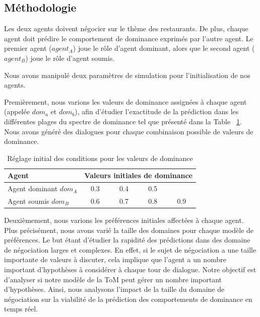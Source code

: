 \subsection{Méthodologie}

Les deux agents doivent négocier sur le thème des restaurants. De plus, chaque agent doit prédire le comportement de dominance exprimés par l'autre agent.
Le premier agent ($ agent_A $) joue le rôle d'agent dominant, alors que le second agent ($ agent_B $) joue le rôle d'agent soumis.

Nous avons manipulé deux paramètres de simulation pour l'initialisation de nos agents.

Premièrement, nous varions les valeurs de dominance assignées à chaque agent (appelée \emph {$dom_a$} et \emph {$dom_b$}), afin d'étudier l'exactitude de la prédiction dans les différentes plages du spectre de dominance tel que présenté dans la Table ~\ref {tab:domsettings}. Nous avons généré des dialogues pour chaque combinaison possible de valeurs de dominance.

\begin{table}[h]
	\centering
	\caption{Réglage initial des conditions pour les valeurs de dominance} 
	\begin{tabular}{|l|cccc|}
		\hline 
		\textbf{Agent} &	\multicolumn{4}{c|}{ \textbf{Valeurs initiales de dominance}} \\
		\hline
		Agent dominant $dom_A$ & 0.3 & 0.4 & 0.5 &  \\
		\hline
		Agent soumis $dom_B$ & 0.6 & 0.7 & 0.8 & 0.9\\
		\hline
	\end{tabular}
	
	\label{tab:domsettings}
\end{table}

Deuxièmement, nous varions les préférences initiales affectées à chaque agent. Plus précisément, nous avons varié la taille des domaines pour chaque modèle de préférences. Le but étant d'étudier la rapidité des prédictions dans des domaine de négociation larges et complexes. En effet, si le sujet de négociation a une taille importante de valeurs à discuter, cela implique que l'agent a un nombre important d'hypothèses à considérer à chaque tour de dialogue. Notre objectif est d'analyser si notre modèle de la ToM peut gérer un nombre important d'hypothèses. Ainsi, nous analysons  l'impact de la taille du domaine de négociation sur la viabilité de la prédiction des comportements de dominance en temps réel.

